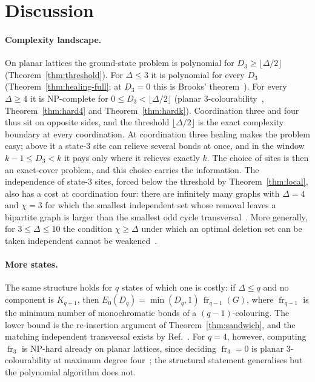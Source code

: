 \documentclass[aps,pre,twocolumn,floatfix,10pt]{revtex4-2}
\theoremstyle{definition}
\theoremstyle{remark}
\newcommand{\fr}{\operatorname{fr}}
\newcommand{\OPT}{E_0}
\begin{document}
\section{Discussion}
\label{sec:discussion}
\paragraph*{Complexity landscape.} On planar lattices the ground-state problem is polynomial for
$D_3\ge\lfloor\Delta/2\rfloor$ (Theorem~\ref{thm:threshold}). For $\Delta\le3$ it is polynomial for
every $D_3$ (Theorem~\ref{thm:healing-full}; at $D_3=0$ this is Brooks' theorem~\cite{Brooks1941}).
For every $\Delta\ge4$ it is NP-complete for $0\le D_3<\lfloor\Delta/2\rfloor$ (planar
3-colourability~\cite{GareyJohnsonStockmeyer1976}, Theorem~\ref{thm:hard4} and
Theorem~\ref{thm:hardk}). Coordination three and four thus sit on
opposite sides, and the threshold $\lfloor\Delta/2\rfloor$ is the exact complexity boundary at
every coordination. At coordination three healing makes the problem easy; above it a state-3 site
can relieve several bonds at once, and in the window $k-1\le D_3<k$ it pays only where it relieves
exactly $k$. The choice of sites is then an exact-cover problem, and this choice carries the
information. The independence of state-3 sites, forced below the threshold by
Theorem~\ref{thm:local}, also has a cost at coordination four: there are infinitely many graphs
with $\Delta=4$ and $\chi=3$ for which the smallest independent set whose removal leaves a
bipartite graph is larger than the smallest odd cycle transversal~\cite{Knor2022}. More
generally, for $3\le\Delta\le10$ the condition $\chi\ge\Delta$ under which an optimal deletion set
can be taken independent cannot be weakened~\cite{Cambie2024}.

\paragraph*{More states.} The same structure holds for $q$ states of which one is costly: if
$\Delta\le q$ and no component is $K_{q+1}$, then $\OPT(D_q)=\min(D_q,1)\,\fr_{q-1}(G)$, where
$\fr_{q-1}$ is the minimum number of monochromatic bonds of a $(q-1)$-colouring. The lower bound is
the re-insertion argument of Theorem~\ref{thm:sandwich}, and the matching independent transversal
exists by Ref.~\cite{Akbari2022}. For $q=4$, however, computing $\fr_3$ is NP-hard already on planar
lattices, since deciding $\fr_3=0$ is planar 3-colourability at maximum degree
four~\cite{GareyJohnsonStockmeyer1976}; the structural statement generalises but the polynomial
algorithm does not.
\end{document}
